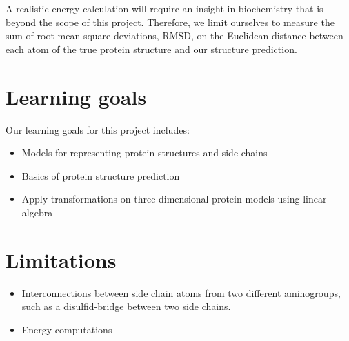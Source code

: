 \documentclass[10pt,a4paper,final,oneside,openany,article]{memoir}
\begin{document}
A realistic energy calculation will require an insight in
biochemistry that is beyond the scope of this project.  Therefore, we
limit ourselves to measure the sum of root mean square deviations,
RMSD, on the Euclidean distance between each atom of the true protein
structure and our structure prediction.



\section{Learning goals}
Our learning goals for this project includes:
\begin{itemize}
\item Models for representing protein structures and side-chains
\item Basics of protein structure prediction
\item Apply transformations on three-dimensional protein models using linear algebra
\end{itemize}


\section{Limitations}
\begin{itemize}
\item Interconnections between side chain atoms from two different
  aminogroups, such as a disulfid-bridge between two side chains.
\item Energy computations
\end{itemize}





\end{document}
